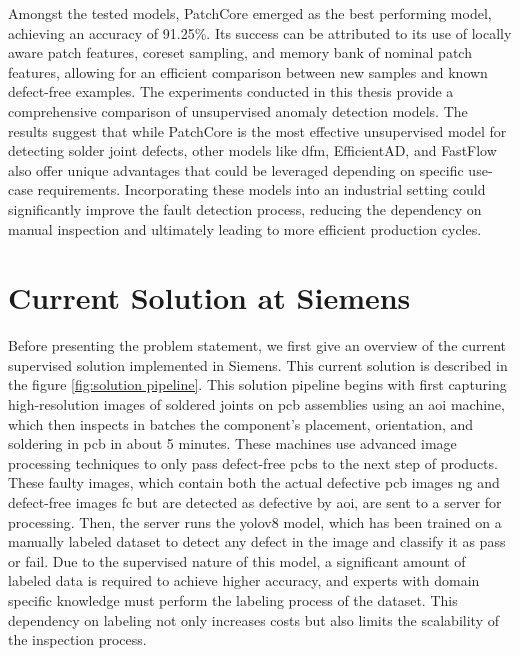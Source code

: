 Amongst the tested models, PatchCore emerged as the best performing model, achieving an accuracy of 91.25\%. Its success can be attributed to its use of locally aware patch features, coreset sampling, and memory bank of nominal patch features, allowing for an efficient comparison between new samples and known defect-free examples. The experiments conducted in this thesis provide a comprehensive comparison of unsupervised anomaly detection models. The results suggest that while PatchCore is the most effective unsupervised model for detecting solder joint defects, other models like \gls{dfm}, EfficientAD, and FastFlow also offer unique advantages that could be leveraged depending on specific use-case requirements. Incorporating these models into an industrial setting could significantly improve the fault detection process, reducing the dependency on manual inspection and ultimately leading to more efficient production cycles.

\section{Current Solution at Siemens}
\label{subsec:current solution at siemens}

Before presenting the problem statement, we first give an overview of the current supervised solution implemented in Siemens. This current solution is described in the figure \ref{fig:solution pipeline}. This solution pipeline begins with first capturing high-resolution images of soldered joints on \gls{pcb} assemblies using an \gls{aoi} machine, which then inspects in batches the component's placement, orientation, and soldering in \gls{pcb} \cite{yingxing2024} in about 5 minutes. These machines use advanced image processing techniques to only pass defect-free \glspl{pcb} to the next step of products. These faulty images, which contain both the actual defective \gls{pcb} images \gls{ng} and defect-free images \gls{fc} but are detected as defective by \gls{aoi}, are sent to a server for processing. Then, the server runs the \gls{yolo}v8 model, which has been trained on a manually labeled dataset to detect any defect in the image and classify it as pass or fail. Due to the supervised nature of this model, a significant amount of labeled data is required to achieve higher accuracy, and experts with domain specific knowledge must perform the labeling process of the dataset. This dependency on labeling not only increases costs but also limits the scalability of the inspection process.

